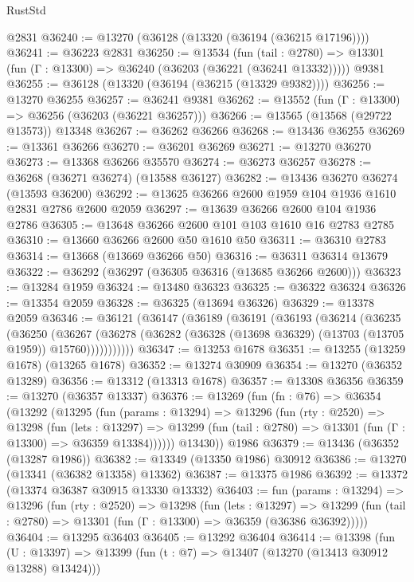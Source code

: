 \begin{lexlean}{RustStd}
\begin{coremodule}
    @2831
@36240 := @13270 (@36128 (@13320 (@36194 (@36215 @17196))))
@36241 := @36223 @2831
@36250 := @13534
    (fun (tail : @2780) => @13301 (fun (Γ : @13300) => @36240 (@36203 (@36221 (@36241 @13332)))))
    @9381
@36255 := @36128 (@13320 (@36194 (@36215 (@13329 @9382))))
@36256 := @13270 @36255
@36257 := @36241 @9381
@36262 := @13552 (fun (Γ : @13300) => @36256 (@36203 (@36221 @36257)))
@36266 := @13565 (@13568 (@29722 @13573)) @13348
@36267 := @36262 @36266
@36268 := @13436 @36255
@36269 := @13361 @36266
@36270 := @36201 @36269
@36271 := @13270 @36270
@36273 := @13368 @36266 @35570
@36274 := @36273 @36257
@36278 := @36268 (@36271 @36274) (@13588 @36127)
@36282 := @13436 @36270 @36274 (@13593 @36200)
@36292 := @13625 @36266 @2600 @1959 @104 @1936 @1610 @2831 @2786 @2600 @2059
@36297 := @13639 @36266 @2600 @104 @1936 @2786
@36305 := @13648 @36266 @2600 @101 @103 @1610 @16 @2783 @2785
@36310 := @13660 @36266 @2600 @50 @1610 @50
@36311 := @36310 @2783
@36314 := @13668 (@13669 @36266 @50)
@36316 := @36311 @36314 @13679
@36322 := @36292 (@36297 (@36305 @36316 (@13685 @36266 @2600)))
@36323 := @13284 @1959
@36324 := @13480 @36323
@36325 := @36322 @36324
@36326 := @13354 @2059
@36328 := @36325 (@13694 @36326)
@36329 := @13378 @2059
@36346 := @36121
    (@36147
      (@36189
        (@36191
          (@36193
            (@36214
              (@36235
                (@36250
                  (@36267
                    (@36278
                      (@36282 (@36328 (@13698 @36329) (@13703 (@13705 @1959)) @15760)))))))))))
@36347 := @13253 @1678
@36351 := @13255 (@13259 @1678) (@13265 @1678)
@36352 := @13274 @30909
@36354 := @13270 (@36352 @13289)
@36356 := @13312 (@13313 @1678)
@36357 := @13308 @36356
@36359 := @13270 (@36357 @13337)
@36376 := @13269
    (fun (fn : @76) =>
    @36354
      (@13292
        (@13295
          (fun (params : @13294) =>
          @13296
            (fun (rty : @2520) =>
            @13298
              (fun (lets : @13297) =>
              @13299 (fun (tail : @2780) => @13301 (fun (Γ : @13300) => @36359 @13384))))))
        @13430))
    @1986
@36379 := @13436 (@36352 (@13287 @1986))
@36382 := @13349 (@13350 @1986) @30912
@36386 := @13270 (@13341 (@36382 @13358) @13362)
@36387 := @13375 @1986
@36392 := @13372 (@13374 @36387 @30915 @13330 @13332)
@36403 := fun (params : @13294) =>
  @13296
    (fun (rty : @2520) =>
    @13298
      (fun (lets : @13297) =>
      @13299 (fun (tail : @2780) => @13301 (fun (Γ : @13300) => @36359 (@36386 @36392)))))
@36404 := @13295 @36403
@36405 := @13292 @36404
@36414 := @13398
    (fun (U : @13397) => @13399 (fun (t : @7) => @13407 (@13270 (@13413 @30912 @13288) @13424)))

\end{coremodule}
\end{lexlean}
